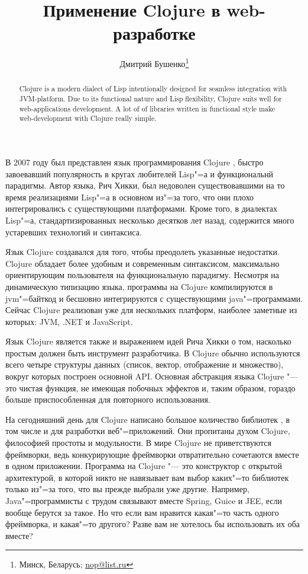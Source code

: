 \documentclass[10pt, a5paper]{article}
\begin{document}
\title{Применение Clojure в web-разработке}%

\author{Дмитрий Бушенко\footnote{Минск, Беларусь; \url{nop@list.ru}}}
\maketitle

\begin{abstract}
Clojure is a modern dialect of Lisp intentionally designed for seamless integration with  JVM-platform. Due to its functional nature and Lisp flexibility, Clojure suits well for web-applications development. A lot of of libraries written in functional style make web-development with Clojure really simple.
\end{abstract}

В 2007 году был представлен язык программирования Clojure \cite{Bushenko1}, быстро завоевавший популярность в кругах любителей Lisp"=а и функциональнй парадигмы. Автор языка, Рич Хикки, был недоволен существовавшими на то время реализациями Lisp"=а в основном из"=за того, что они плохо интегрировались с существующими платформами. Кроме того, в диалектах Lisp"=а, стандартизированных несколько десятков лет назад, содержится много устаревших технологий и синтаксиса.

Язык Clojure создавался для того, чтобы преодолеть указанные недостатки. Clojure обладает более удобным и современным синтаксисом, максимально ориентирующим пользователя на функциональную парадигму. Несмотря на динамическую типизацию языка, программы на Clojure компилируются в jvm"=байткод и бесшовно интегрируются с существующими java"=программами. Сейчас Clojure реализован уже для нескольких платформ, наиболее заметные из которых: JVM, .NET и JavaScript.

Язык Clojure является также и выражением идей Рича Хикки о том, насколько простым должен быть инструмент разработчика. В Clojure обычно используются всего четыре структуры данных (список, вектор, отображение и множество), вокруг которых построен основной API. Основная абстракция языка Clojure "--- это чистая функция, не имеющая побочных эффектов и, таким образом, гораздо больше приспособленная для повторного использования.

На сегодняшний день для Clojure написано большое количество библиотек \cite{Bushenko2}, в том числе и для разработки веб"=приложений. Они пропитаны духом Clojure, философией простоты и модульности. В мире Clojure не приветствуются фреймворки, ведь конкурирующие фреймворки отвратительно сочетаются вместе в одном приложении. Программа на Clojure "--- это конструктор с открытой архитектурой, в которой никто не навязывает вам  выбор каких"=то библиотек только из"=за того, что вы прежде выбрали уже другие. Например, Java"=программисты с трудом связывают вместе Spring, Guice и JEE, если вообще берутся за такое. Но что если вам нравится какая"=то часть одного фреймворка, и какая"=то другого? Разве вам не хотелось бы использовать их оба вместе?
\end{document}

